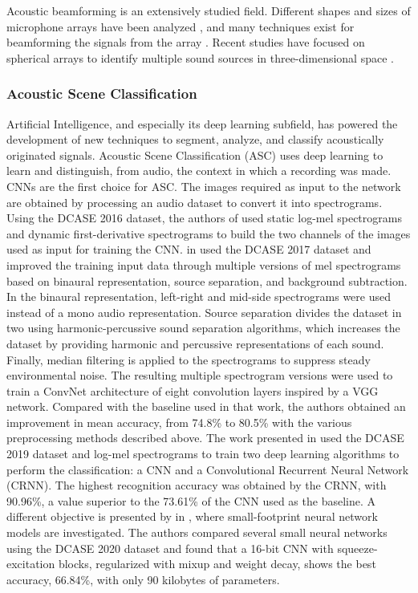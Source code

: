 Acoustic beamforming is an extensively studied field. Different shapes and sizes of microphone arrays have been analyzed \cite{MA02}, and many techniques exist for beamforming the signals from the array \cite{BEA02}. Recent studies have focused on spherical arrays to identify multiple sound sources in three-dimensional space \cite{RWB1, RWB2, RWB3}.

\subsubsection{Acoustic Scene Classification}

Artificial Intelligence, and especially its deep learning subfield, has powered the development of new techniques to segment, analyze, and classify acoustically originated signals. Acoustic Scene Classification (ASC) uses deep learning to learn and distinguish, from audio, the context in which a recording was made. CNNs are the first choice for ASC. The images required as input to the network are obtained by processing an audio dataset to convert it into spectrograms. Using the DCASE 2016 dataset, the authors of \cite{CNNASC1} used static log-mel spectrograms and dynamic first-derivative spectrograms to build the two channels of the images used as input for training the CNN. \citeauthor{CNNASC2} in \cite{CNNASC2} used the DCASE 2017 dataset and improved the training input data through multiple versions of mel spectrograms based on binaural representation, source separation, and background subtraction. In the binaural representation, left-right and mid-side spectrograms were used instead of a mono audio representation. Source separation divides the dataset in two using harmonic-percussive sound separation algorithms, which increases the dataset by providing harmonic and percussive representations of each sound. Finally, median filtering is applied to the spectrograms to suppress steady environmental noise. The resulting multiple spectrogram versions were used to train a ConvNet architecture of eight convolution layers inspired by a VGG network. Compared with the baseline used in that work, the authors obtained an improvement in mean accuracy, from 74.8\% to 80.5\% with the various preprocessing methods described above. The work presented in \cite{ASC3} used the DCASE 2019 dataset and log-mel spectrograms to train two deep learning algorithms to perform the classification: a CNN and a Convolutional Recurrent Neural Network (CRNN). The highest recognition accuracy was obtained by the CRNN, with 90.96\%, a value superior to the 73.61\% of the CNN used as the baseline. A different objective is presented by \citeauthor{ASC4} in \cite{ASC4}, where small-footprint neural network models are investigated. The authors compared several small neural networks using the DCASE 2020 dataset and found that a 16-bit CNN with squeeze-excitation blocks, regularized with mixup and weight decay, shows the best accuracy, 66.84\%, with only 90 kilobytes of parameters.

